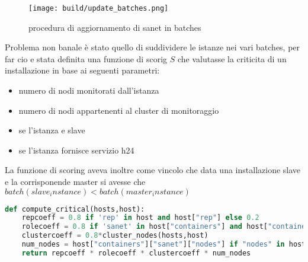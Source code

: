 \begin{figure}[H]
    \centering
    \texttt{[image: build/update\_batches.png]}
    \caption{procedura di aggiornamento di sanet in batches}
    \label{fig:enter-label}
\end{figure}

Problema non banale è stato quello di suddividere le istanze nei vari batches, per far cio e stata definita una funzione di scorig \(S\) che valutasse la criticita di un installazione in base ai seguenti parametri:

\begin{itemize}
  \item{numero di nodi monitorati dall'istanza}
  \item{numero di nodi appartenenti al cluster di monitoraggio}
  \item{se l'istanza e slave}
  \item{se l'istanza fornisce servizio h24}
\end{itemize}

\newpage
La funzione di scoring aveva inoltre come vincolo che data una installazione slave e la corrisponende master si avesse che \(batch(slave_instance) \lt batch(master_instance)\)
\begin{lstlisting}[language=python]
def compute_critical(hosts,host):
    repcoeff = 0.8 if 'rep' in host and host["rep"] else 0.2
    rolecoeff = 0.8 if 'sanet' in host["containers"] and host["containers"]["sanet"]["role"] == "prod" else 0.2
    clustercoeff = 0.8*cluster_nodes(hosts,host)
    num_nodes = host["containers"]["sanet"]["nodes"] if "nodes" in host["containers"]["sanet"] else 1
    return repcoeff * rolecoeff * clustercoeff * num_nodes
\end{lstlisting}


